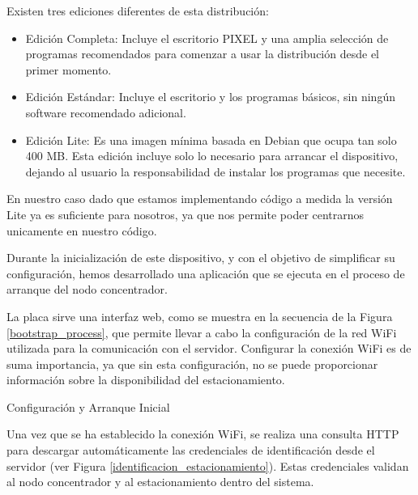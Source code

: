 Existen tres ediciones diferentes de esta distribución:

\begin{itemize}
    \item Edición Completa: Incluye el escritorio PIXEL y una amplia selección de programas recomendados para comenzar a usar la distribución desde el primer momento.
    \item Edición Estándar: Incluye el escritorio y los programas básicos, sin ningún software recomendado adicional.
    \item Edición Lite: Es una imagen mínima basada en Debian que ocupa tan solo 400 MB. Esta edición incluye solo lo necesario para arrancar el dispositivo, dejando al usuario la responsabilidad de instalar los programas que necesite.
\end{itemize}

En nuestro caso dado que estamos implementando código a medida la versión Lite ya es suficiente para nosotros, ya que nos permite poder centrarnos unicamente en nuestro código.


Durante la inicialización de este dispositivo, y con el objetivo de simplificar su configuración, hemos desarrollado una aplicación que se ejecuta en el proceso de arranque del nodo concentrador.

La placa sirve una interfaz web, como se muestra en la secuencia de la Figura \ref{bootstrap_process}, que permite llevar a cabo la configuración de la red WiFi utilizada para la comunicación con el servidor. Configurar la conexión WiFi es de suma importancia, ya que sin esta configuración, no se puede proporcionar información sobre la disponibilidad del estacionamiento.

\begin{images}[\label{bootstrap_process}]{Configuración y Arranque Inicial}
\end{images}

Una vez que se ha establecido la conexión WiFi, se realiza una consulta HTTP para descargar automáticamente las credenciales de identificación desde el servidor (ver Figura \ref{identificacion_estacionamiento}). Estas credenciales validan al nodo concentrador y al estacionamiento dentro del sistema.

